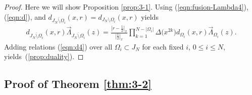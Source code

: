\documentclass[10pt,a4paper]{amsart}
\numberwithin{equation}{section}
\begin{document}
\begin{proof}
Here we will show Proposition \ref{prop:3-1}.
Using (\ref{eqn:fusion-Lambda4}), (\ref{eqn:d}), and $d_{\overline{J_N \setminus \Omega_i}}(x,r)=d_{J_N \setminus \Omega_i}(x,r)$ yields
\begin{gather}
d_{\overline{J_N \setminus \Omega_i}}(x,r)\overrightarrow{\Lambda}_{\overline{J_N \setminus \Omega_i}}(z)=\frac{\big[r-\frac{1}{2}\big]_x}{\big[\frac{1}{2}\big]_x}
\prod_{k=1}^{N-|{\Omega_i}|}\Delta\big(x^{2k}\big) d_{{\Omega_i}}(x,r)
\overrightarrow{\Lambda}_{{\Omega_i}}(z).
\label{eqn:d4}
\end{gather}
{Adding {relations} (\ref{eqn:d4}) over all $\Omega_i \subset J_N$
for each fixed $i$, $0\leq i \leq N$, yields~(\ref{prop:duality})}.
\end{proof}

\subsection{Proof of Theorem \ref{thm:3-2}}
\end{document}
